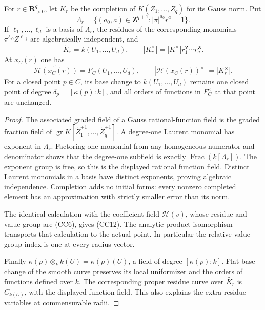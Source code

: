 \begin{lemma}
\label{lem:r13-cc-gauss-residue}
For \(r\in\mathbf R_{>0}^q\), let \(K_r\) be the completion of
\(K(Z_1,\ldots,Z_q)\) for its Gauss norm.  Put
\[
 \Lambda_r=\{(a_0,a)\in\mathbf Z^{q+1}:
                     |\pi|^{a_0}r^a=1\}.
 \tag{CC10}
\]
If \(\ell_1,\ldots,\ell_d\) is a basis of \(\Lambda_r\),
the residues of the corresponding monomials
\(\pi^{\ell_{j0}}Z^{\ell'_j}\) are algebraically independent,
and
\[
 \widetilde {K_r}=k(U_1,\ldots,U_d),\qquad
 |K_r^\times|=|K^\times|r_1^{\mathbf Z}\cdots r_q^{\mathbf Z}.
 \tag{CC11}
\]
At \(x_C(r)\) one has
\[
 \widetilde {\mathcal H(x_C(r))}=F_C(U_1,\ldots,U_d),
 \qquad |\mathcal H(x_C(r))^\times|=|K_r^\times|.
 \tag{CC12}
\]
For a closed point \(p\in C\), its base change to
\(k(U_1,\ldots,U_d)\) remains one closed point of degree
\(\delta_p=[\kappa(p):k]\), and all orders of functions in
\(F_C^\times\) at that point are unchanged.
\end{lemma}

\begin{proof}
The associated graded field of a Gauss rational-function field
is the graded fraction field of
\(\operatorname{gr}K[\widetilde Z_1^{\pm1},\ldots,
\widetilde Z_q^{\pm1}]\).  A degree-one Laurent monomial has
exponent in \(\Lambda_r\).  Factoring one monomial from any
homogeneous numerator and denominator shows that the degree-one
subfield is exactly \(\operatorname{Frac}(k[\Lambda_r])\).
The exponent group is free, so this is the displayed rational
function field.  Distinct Laurent monomials in a basis have
distinct exponents, proving algebraic independence.  Completion
adds no initial forms: every nonzero completed element has an
approximation with strictly smaller error than its norm.

The identical calculation with the coefficient field
\(\mathcal H(v)\), whose residue and value group are (CC6),
gives (CC12).  The analytic product isomorphism transports that
calculation to the actual point.  In particular the relative
value-group index is one at every radius vector.

Finally \(\kappa(p)\otimes_k k(U)=\kappa(p)(U)\), a field of
degree \([\kappa(p):k]\).  Flat base change of the smooth curve
preserves its local uniformizer and the orders of functions
defined over \(k\).  The corresponding proper residue curve
over \(\widetilde {K_r}\) is \(C_{k(U)}\), with the displayed
function field.  This also explains the extra residue variables
at commensurable radii.
\end{proof}

